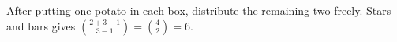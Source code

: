 After putting one potato in each box, distribute the remaining two freely. Stars and bars gives $\binom{2+3-1}{3-1}=\binom42=\boxed6$.

